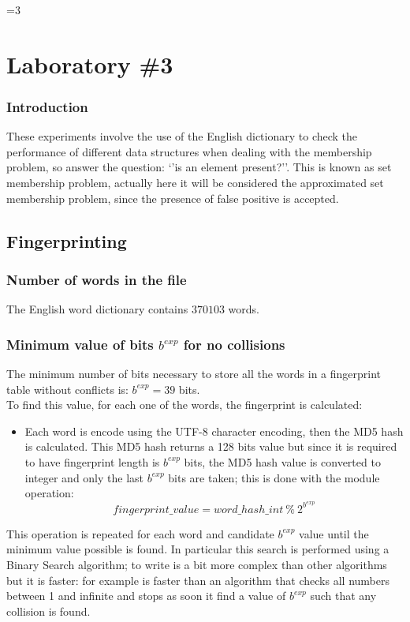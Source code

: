 \documentclass[twocolumn,letterpaper]{report}
\newcounter{debug}
\begin{document}
			
			
\ifnum\value{debug}=3 {

\chapter{Laboratory \#3}
		\subsection*{Introduction} 
				These experiments involve the use of the English dictionary to check the performance of different data structures when dealing with the membership problem, so answer the question: `'is an element present?''. This is known as set membership problem, actually here it will be considered the approximated set membership problem, since the presence of false positive is accepted.
	 
	 \section{Fingerprinting}	 
	 
			 	\subsection{Number of words in the file}
								The English word dictionary contains $370103$ words.
								
			 	\subsection{Minimum value of bits $b^{exp}$ for no collisions}
						The minimum number of bits necessary to store all the words in a fingerprint table without conflicts is: $b^{exp} = 39$ bits. \\
						To find this value, for each one of the words, the fingerprint is calculated:
						\begin{itemize}
								\item[] Each word is encode using the UTF-8 character encoding, then the MD5 hash is calculated. This MD5 hash returns a 128 bits value but since it is required to have fingerprint length is $b^{exp}$ bits, the MD5 hash value is converted to integer and only the last  $b^{exp}$ bits are taken; this is done with the module operation: \[ fingerprint\_value = word\_hash\_int \: \% \: 2^{b^{exp}} \]
						\end{itemize}
						This operation is repeated for each word and candidate $b^{exp}$ value until the minimum value possible is found. In particular this search is performed using a Binary Search algorithm; to write is a bit more complex than other algorithms but it is faster: for example is faster than an algorithm that checks all numbers between 1 and infinite and stops as soon it find a value of $b^{exp}$ such that any collision is found.
						
}
\end{document}
